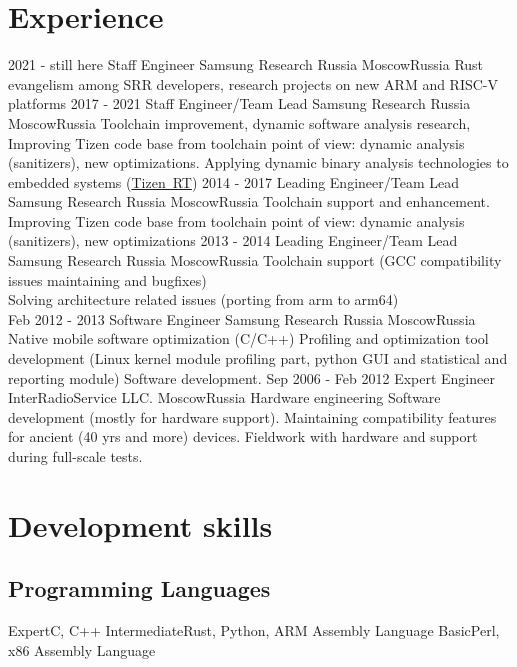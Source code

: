 \documentclass[11pt,a4paper]{moderncv}
\begin{document}
\section{Experience}
\cventry
  {2021 - still here}
  {Staff Engineer}
  {Samsung Research Russia}
  {Moscow}{Russia}
  {Rust evangelism among SRR developers, research projects on new ARM and RISC-V platforms}
\cventry
  {2017 - 2021}
  {Staff Engineer/Team Lead}
  {Samsung Research Russia}
  {Moscow}{Russia}
  {Toolchain improvement, dynamic software analysis research, Improving Tizen
    code base from toolchain point of view: dynamic analysis (sanitizers), new
    optimizations. Applying dynamic binary analysis technologies to embedded
    systems (\href{https://github.com/Samsung/TizenRT}{Tizen~RT})}
\cventry
  {2014 - 2017}
  {Leading Engineer/Team Lead}
  {Samsung Research Russia}
  {Moscow}{Russia}
  {Toolchain support and enhancement. Improving Tizen code base from toolchain point of view: dynamic analysis
    (sanitizers), new optimizations}
\cventry
  {2013 - 2014}
  {Leading Engineer/Team Lead}
  {Samsung Research Russia}
  {Moscow}{Russia}
  {Toolchain support (GCC compatibility issues maintaining and bugfixes)\\
Solving architecture related issues (porting from arm to arm64)\\}
\cventry
  {Feb 2012 - 2013}
  {Software Engineer}
  {Samsung Research Russia}
  {Moscow}{Russia}
  {Native mobile software optimization (C/C++)\newline{}
Profiling and optimization tool development (Linux kernel module profiling part, python GUI and statistical and reporting module)\newline{}
Software development.}
\cventry
  {Sep 2006 - Feb 2012}
  {Expert Engineer}
  {InterRadioService LLC.}
  {Moscow}{Russia}
  {Hardware engineering\newline{}
Software development (mostly for hardware support).\newline{}
Maintaining compatibility features for ancient (40 yrs and more) devices.\newline{}
Fieldwork with hardware and support during full-scale tests.\newline{}}

\section{Development skills}
\subsection{Programming Languages}
\cvitem
  {Expert}{C, C++}
\cvitem
  {Intermediate}{Rust, Python, ARM Assembly Language}
\cvitem
  {Basic}{Perl, x86 Assembly Language}
\end{document}
